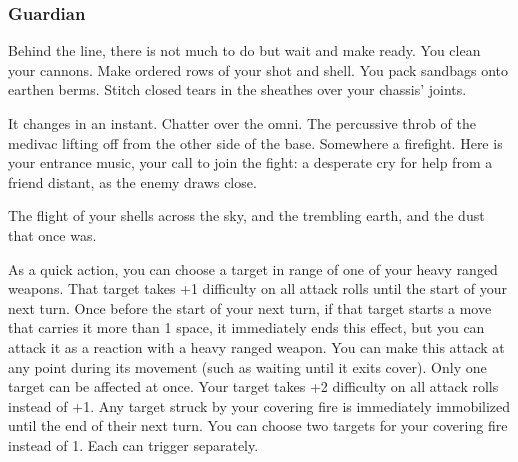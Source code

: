 \subsubsection{Guardian}
\begin{talent}
{Behind the line, there is not much to do but wait and make ready. You clean your cannons. Make ordered rows of your shot and shell. You pack sandbags onto earthen berms. Stitch closed tears in the sheathes over your chassis’ joints.

It changes in an instant. Chatter over the omni. The percussive throb of the medivac lifting off from the other side of the base. Somewhere a firefight. Here is your entrance music, your call to join the fight: a desperate cry for help from a friend distant, as the enemy draws close.

The flight of your shells across the sky, and the trembling earth, and the dust that once was.}

As a quick action, you can choose a target in range of one of your heavy ranged weapons. That target takes +1 difficulty on all attack rolls until the start of your next turn. Once before the start of your next turn, if that target starts a move that carries it more than 1 space, it immediately ends this effect, but you can attack it as a reaction with a heavy ranged weapon. You can make this attack at any point during its movement (such as waiting until it exits cover). Only one target can be affected at once. 
Your target takes +2 difficulty on all attack rolls instead of +1. Any target struck by your covering fire is immediately immobilized until the end of their next turn. 
You can choose two targets for your covering fire instead of 1. Each can trigger separately.
\end{talent}